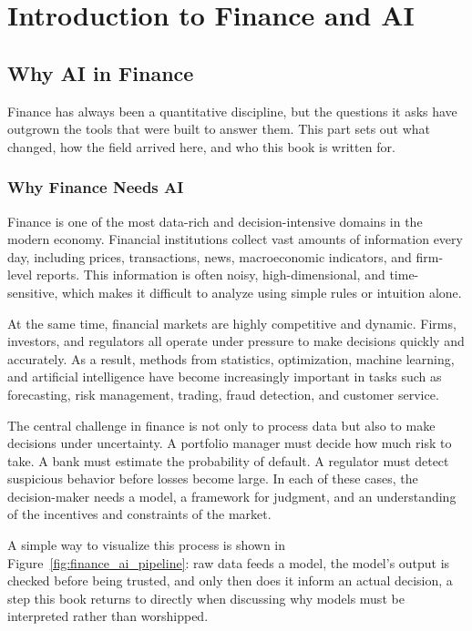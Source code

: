 \documentclass[../ai_in_finance]{subfiles}
\begin{document}
\chapter{Introduction to Finance and AI}

\section{Why AI in Finance}

Finance has always been a quantitative discipline, but the questions it asks have outgrown the tools that were built to answer them. This part sets out what changed, how the field arrived here, and who this book is written for.

\subsection{Why Finance Needs AI}

Finance is one of the most data-rich and decision-intensive domains in the modern economy. Financial institutions collect vast amounts of information every day, including prices, transactions, news, macroeconomic indicators, and firm-level reports. This information is often noisy, high-dimensional, and time-sensitive, which makes it difficult to analyze using simple rules or intuition alone.

At the same time, financial markets are highly competitive and dynamic. Firms, investors, and regulators all operate under pressure to make decisions quickly and accurately. As a result, methods from statistics, optimization, machine learning, and artificial intelligence have become increasingly important in tasks such as forecasting, risk management, trading, fraud detection, and customer service.

The central challenge in finance is not only to process data but also to make decisions under uncertainty. A portfolio manager must decide how much risk to take. A bank must estimate the probability of default. A regulator must detect suspicious behavior before losses become large. In each of these cases, the decision-maker needs a model, a framework for judgment, and an understanding of the incentives and constraints of the market.

A simple way to visualize this process is shown in Figure~\ref{fig:finance_ai_pipeline}: raw data feeds a model, the model's output is checked before being trusted, and only then does it inform an actual decision, a step this book returns to directly when discussing why models must be interpreted rather than worshipped.
\end{document}
